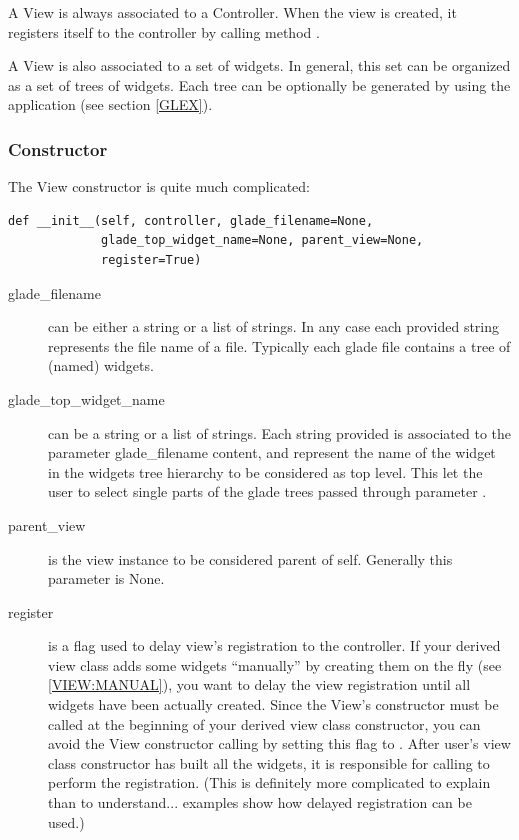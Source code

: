 A View is always associated to a Controller. When the view is created,
it registers itself to the controller by calling method
.

A View is also associated to a set of widgets. In general, this set
can be organized as a set of trees of widgets. Each tree can be
optionally be generated by using the \glade application 
(see section \ref{GLEX}). 


\subsubsection{Constructor}

The View constructor is quite much complicated:

{ \codesize 
\begin{verbatim} 
def __init__(self, controller, glade_filename=None,
             glade_top_widget_name=None, parent_view=None, 
             register=True)
\end{verbatim}} 


\begin{description}
\item[glade\_filename] can be either a string or a list of strings. In
  any case each provided string represents the file name of a \glade
  file. Typically each glade file contains a tree of (named) widgets.

\item[glade\_top\_widget\_name] can be a string or a list of strings.
  Each string provided is associated to the parameter glade\_filename
  content, and represent the name of the widget in the widgets tree
  hierarchy to be considered as top level. This let the user to select
  single parts of the glade trees passed through parameter
  .

\item[parent\_view] is the view instance to be considered parent of
self. Generally this parameter is None. 

\item[register] is a flag used to delay view's registration to the
  controller. If your derived view class adds some widgets
  ``manually'' by creating them on the fly (see \ref{VIEW:MANUAL}),
  you want to delay the view registration until all widgets have been
  actually created.  Since the View's constructor must be called at
  the beginning of your derived view class constructor, you can avoid
  the View constructor calling  by
  setting this flag to . After user's view class
  constructor has built all the widgets, it is responsible for
  calling  to perform the
  registration.  (This is definitely more complicated to explain than
  to understand...  examples show how delayed registration can be
  used.)
\end{description}


